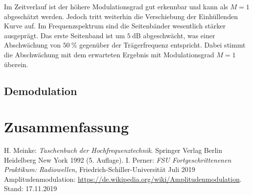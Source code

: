 \documentclass[a4paper,twoside,final]{article}
\begin{document}
Im Zeitverlauf ist der höhere Modulationsgrad gut erkennbar und kann als $M = 1$ abgeschätzt werden. Jedoch tritt weiterhin die Verschiebung der Einhüllenden Kurve auf. Im Frequenzspektrum sind die Seitenbänder wesentlich stärker ausgeprägt. Das erste Seitenband ist um $\SI{5}{\deci\bel}$ abgeschwächt, was einer Abschwächung von $\SI{50}{\percent}$ gegenüber der Trägerfrequenz entspricht. Dabei stimmt die Abschwächung mit dem erwarteten Ergebnis mit Modulationsgrad $M =1$ überein.
\subsection{Demodulation}


\section{Zusammenfassung}



\begin{thebibliography}{xxx}
	H. Meinke: \textit{Taschenbuch der Hochfrequenztechnik}. Springer Verlag Berlin Heidelberg New York 1992 (5. Auflage).
  I. Perner: \textit{FSU Fortgeschrittenenen Praktikum: Radiowellen}, Fried\-rich-Schil\-ler-Uni\-versi\-tät Juli 2019
  Amplitudenmodulation: \url{https://de.wikipedia.org/wiki/Amplitudenmodulation}. Stand: 17.11.2019
\end{thebibliography}
\end{document}
